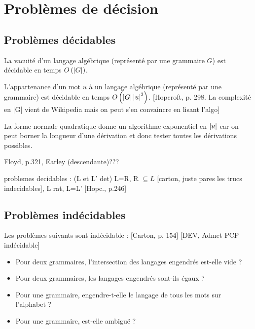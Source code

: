 \documentclass[../../agregation.tex]{subfiles}
\begin{document}
\section{Problèmes de décision}

\subsection{Problèmes décidables}
\begin{thm}
	La vacuité d'un langage algébrique (représenté par une grammaire $G$)
	est décidable en temps $O\left(\left|G\right|\right)$.
\end{thm}

\begin{thm}
	L'appartenance d'un mot $u$ à un langage algébrique (représenté par
	une grammaire) est décidable en temps $O\left(\left|G\right|\left|u\right|^{3}\right)$.
	{[}Hopcroft, p. 298. La complexité en |G| vient de Wikipedia mais
	on peut s'en convaincre en lisant l'algo{]}\end{thm}
\begin{rem}
	La forme normale quadratique donne un algorithme exponentiel en $\left|u\right|$
	car on peut borner la longueur d'une dérivation et donc tester toutes
	les dérivations possibles.\\
	
\end{rem}
Floyd, p.321, Earley (descendante)???

problemes decidables : (L et L' det) L=R, R $\subseteq L$ {[}carton,
juste pares les trucs indecidables{]}, L rat, L=L' {[}Hopc., p.246{]}


\subsection{Problèmes indécidables}
\begin{prop}
	Les problèmes suivants sont indécidable : {[}Carton, p. 154{]} {[}DEV,
	Admet PCP indécidable{]}
	\begin{itemize}
		\item Pour deux grammaires, l'intersection des langages engendrés est-elle
		vide ?
		\item Pour deux grammaires, les langages engendrés sont-ils égaux ?
		\item Pour une grammaire, engendre-t-elle le langage de tous les mots sur
		l'alphabet ?
		\item Pour une grammaire, est-elle ambiguë ?
	\end{itemize}
\end{prop}
\end{document}
